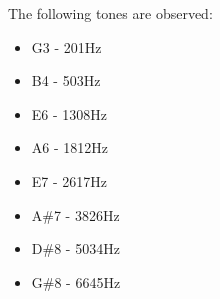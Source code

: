 The following tones are observed:
\begin{itemize}
    \item G3 - 201Hz
    \item B4 - 503Hz
    \item E6 - 1308Hz
    \item A6 - 1812Hz
    \item E7 - 2617Hz
    \item A\#7 - 3826Hz
    \item D\#8 - 5034Hz
    \item G\#8 - 6645Hz
\end{itemize}